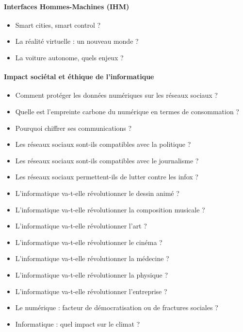 \documentclass[
  letterpaper,
  DIV=11,
  numbers=noendperiod]{scrartcl}
\let\oldparagraph\paragraph
\renewcommand{\paragraph}[1]{\oldparagraph{#1}\mbox{}}
\providecommand{\tightlist}{%
  \setlength{\itemsep}{0pt}\setlength{\parskip}{0pt}}\usepackage{longtable,booktabs,array}
\begin{document}
\hypertarget{interfaces-hommes-machines-ihm}{%
\paragraph{Interfaces Hommes-Machines
(IHM)}\label{interfaces-hommes-machines-ihm}}

\begin{itemize}
\tightlist
\item
  Smart cities, smart control ?
\item
  La réalité virtuelle : un nouveau monde ?
\item
  La voiture autonome, quels enjeux ?
\end{itemize}

\hypertarget{impact-sociuxe9tal-et-uxe9thique-de-linformatique}{%
\paragraph{Impact sociétal et éthique de
l'informatique}\label{impact-sociuxe9tal-et-uxe9thique-de-linformatique}}

\begin{itemize}
\tightlist
\item
  Comment protéger les données numériques sur les réseaux sociaux ?
\item
  Quelle est l'empreinte carbone du numérique en termes de consommation
  ?
\item
  Pourquoi chiffrer ses communications ?
\item
  Les réseaux sociaux sont-ils compatibles avec la politique ?
\item
  Les réseaux sociaux sont-ils compatibles avec le journalisme ?
\item
  Les réseaux sociaux permettent-ils de lutter contre les infox ?
\item
  L'informatique va-t-elle révolutionner le dessin animé ?
\item
  L'informatique va-t-elle révolutionner la composition musicale ?
\item
  L'informatique va-t-elle révolutionner l'art ?
\item
  L'informatique va-t-elle révolutionner le cinéma ?
\item
  L'informatique va-t-elle révolutionner la médecine ?
\item
  L'informatique va-t-elle révolutionner la physique ?
\item
  L'informatique va-t-elle révolutionner l'entreprise ?
\item
  Le numérique : facteur de démocratisation ou de fractures sociales ?
\item
  Informatique : quel impact sur le climat ?
\end{itemize}
\end{document}
